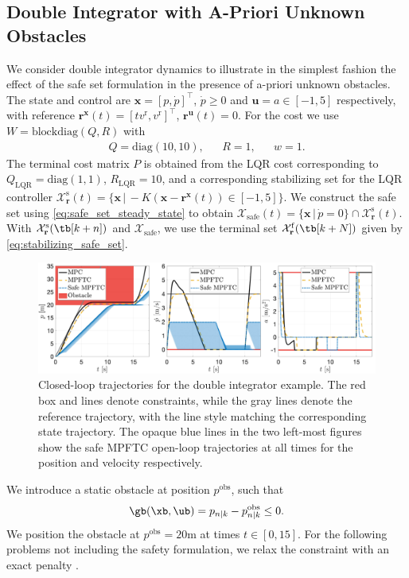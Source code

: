 \documentclass[journal]{IEEEtran}
\newcommand{\x}{{\mathbf{x}}}
\renewcommand{\u}{{\mathbf{u}}}
\renewcommand{\r}{{\mathbf{r}}}
\begin{document}
	\subsection{Double Integrator with A-Priori Unknown Obstacles}\label{sec:example_double}
	We consider double integrator dynamics to illustrate in the simplest fashion the effect of the safe set formulation in the presence of a-priori unknown obstacles. The state and control are $\x=[p,\dot{p}]^\top$, $\dot{p}\geq{}0$ and $\u=a\in[-1,5]$ respectively, with
	reference $\r^\x(t)=[tv^{\mathrm{r}},v^{\mathrm{r}}]^\top$, $\r^\u(t)=0$. For the cost we use $W = \mathrm{blockdiag}(Q,R)$ with
	\begin{align*}
	Q=\mathrm{diag}(10,10), && R=1, && w=1.
	\end{align*}
	The terminal cost matrix $P$ is obtained from the LQR cost corresponding to $Q_\mathrm{LQR}=\mathrm{diag}(1,1)$, $R_\mathrm{LQR}=10$, and 
	a corresponding stabilizing set for the LQR controller $\mathcal{X}^\mathrm{s}_\r(t)=\{ \x\,|\, -K(\x-\r^\x(t))\in[-1,5]\}$. We construct the safe set using \eqref{eq:safe_set_steady_state} to obtain $\mathcal{X}_\mathrm{safe}(t)=\{ \x\,|\,\dot{p}=0\}\cap\mathcal{X}_\r^\mathrm{s}(t)$. With $\mathcal{X}^\mathrm{s}_\r(\tb[k+n])$ and $\mathcal{{X}}_\mathrm{safe}$, we use the terminal set $\mathcal{X}^\mathrm{f}_\r(\tb[k+N])$  given by \eqref{eq:stabilizing_safe_set}. 
	
	\begin{figure}[ht!]
		\centering
		\includegraphics[width=\linewidth]{double_integrator_states}  
		\caption{Closed-loop trajectories for the double integrator example. The red box and lines denote constraints, while the gray lines denote the reference trajectory, with the line style matching the corresponding state trajectory. The opaque blue lines in the two left-most figures show the safe MPFTC open-loop trajectories at all times for the position and velocity respectively.}
		\label{fig:safe_mpftc_crash}
	\end{figure}
	
	We introduce a static obstacle at position $p^{\mathrm{obs}}$, such that
	\begin{equation}\label{eq:double_integrator_obstacle}
	\gb(\xb,\ub) = p_{n|k} - p^{\mathrm{obs}}_{n|k} \leq{} 0.
	\end{equation}
	We position the obstacle at $p^{\mathrm{obs}}=20$m at times $t\in[0,15]$. For the following problems not including  the safety formulation, we relax the constraint with an exact penalty \cite{Scokaert1999a}.
	
\end{document}
